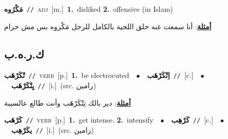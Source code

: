 \documentclass[10pt,a4paper,twoside]{article} %
\begin{document}
\begin{multicols}{2}
{\setlength\topsep{0pt}\textbf{\foreignlanguage{arabic}{مَكْرُوه}}\ {\color{gray}\texttt{//}\color{black}}\ \textsc{adj}\ [m.]\ \textbf{1.}~disliked  \textbf{2.}~offensive (in Islam)\  \begin{flushright}\color{gray}\foreignlanguage{arabic}{\textbf{\underline{\foreignlanguage{arabic}{أمثلة}}}: أنا سمعت غنه حلق اللحية بالكامل للرجل مَكْروه بس مش حرام}\end{flushright}\color{black}} \vspace{2mm}

\vspace{-3mm}
\subsection*{\color{blue}\foreignlanguage{arabic}{ك.ر.ه.ب}\color{blue}{}} 

{\setlength\topsep{0pt}\textbf{\foreignlanguage{arabic}{تْكَرْهَب}}\ {\color{gray}\texttt{//}\color{black}}\ \textsc{verb}\ [p.]\ \textbf{1.}~be electrocuted\ \ $\bullet$\ \ \setlength\topsep{0pt}\textbf{\foreignlanguage{arabic}{اِتْكَرْهَب}}\ {\color{gray}\texttt{//}\color{black}}\ [c.]\ \ $\bullet$\ \ \setlength\topsep{0pt}\textbf{\foreignlanguage{arabic}{يِتْكَرْهَب}}\ {\color{gray}\texttt{//}\color{black}}\ [i.]\ (src. \color{gray}\foreignlanguage{arabic}{رامين}\color{black})\  \begin{flushright}\color{gray}\foreignlanguage{arabic}{\textbf{\underline{\foreignlanguage{arabic}{أمثلة}}}: دير بالك تِتْكَرْهَب وأنت طالع عالسيبة}\end{flushright}\color{black}} \vspace{2mm}

{\setlength\topsep{0pt}\textbf{\foreignlanguage{arabic}{كَرْهَب}}\ {\color{gray}\texttt{//}\color{black}}\ \textsc{verb}\ [p.]\ \textbf{1.}~get intense.  \textbf{2.}~intensify\ \ $\bullet$\ \ \setlength\topsep{0pt}\textbf{\foreignlanguage{arabic}{كَرْهِب}}\ {\color{gray}\texttt{//}\color{black}}\ [c.]\ \ $\bullet$\ \ \setlength\topsep{0pt}\textbf{\foreignlanguage{arabic}{يكَرْهِب}}\ {\color{gray}\texttt{//}\color{black}}\ [i.]\ (src. \color{gray}\foreignlanguage{arabic}{رامين}\color{black})\ } \vspace{2mm}


\end{multicols}
\end{document}
